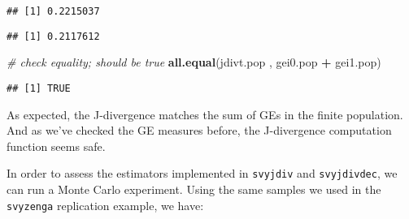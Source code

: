 \documentclass[
]{book}
\newenvironment{Shaded}{\begin{snugshade}}{\end{snugshade}}
\newcommand{\AttributeTok}[1]{\textcolor[rgb]{0.13,0.29,0.53}{#1}}
\newcommand{\CommentTok}[1]{\textcolor[rgb]{0.56,0.35,0.01}{\textit{#1}}}
\newcommand{\ConstantTok}[1]{\textcolor[rgb]{0.56,0.35,0.01}{#1}}
\newcommand{\ControlFlowTok}[1]{\textcolor[rgb]{0.13,0.29,0.53}{\textbf{#1}}}
\newcommand{\DecValTok}[1]{\textcolor[rgb]{0.00,0.00,0.81}{#1}}
\newcommand{\FunctionTok}[1]{\textcolor[rgb]{0.13,0.29,0.53}{\textbf{#1}}}
\newcommand{\NormalTok}[1]{#1}
\newcommand{\OtherTok}[1]{\textcolor[rgb]{0.56,0.35,0.01}{#1}}
\newcommand{\SpecialCharTok}[1]{\textcolor[rgb]{0.81,0.36,0.00}{\textbf{#1}}}
\begin{document}
\begin{verbatim}
## [1] 0.2215037
\end{verbatim}

\begin{Shaded}
\end{Shaded}

\begin{verbatim}
## [1] 0.2117612
\end{verbatim}

\begin{Shaded}
\begin{Highlighting}[]
\CommentTok{\# check equality; should be true}
\FunctionTok{all.equal}\NormalTok{(jdivt.pop , gei0.pop }\SpecialCharTok{+}\NormalTok{ gei1.pop)}
\end{Highlighting}
\end{Shaded}

\begin{verbatim}
## [1] TRUE
\end{verbatim}

As expected, the J-divergence matches the sum of GEs in the finite population. And as we've checked the GE measures before, the J-divergence computation function seems safe.

In order to assess the estimators implemented in \texttt{svyjdiv} and \texttt{svyjdivdec}, we can run a Monte Carlo experiment. Using the same samples we used in the \texttt{svyzenga} replication example, we have:

\begin{Shaded}
\end{Shaded}
\end{document}
